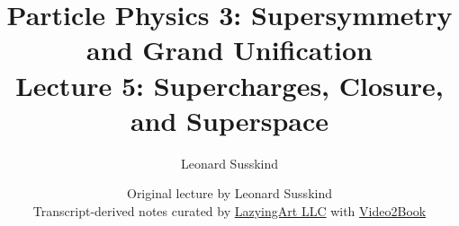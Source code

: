 \documentclass[11pt,oneside]{book}
\begin{document}
\frontmatter
\title{Particle Physics 3: Supersymmetry and Grand Unification\\[0.5em]
\large Lecture 5: Supercharges, Closure, and Superspace}
\author{Leonard Susskind}
\date{Original lecture by Leonard Susskind\\[0.4em]
Transcript-derived notes curated by
\href{https://lazying.art}{LazyingArt LLC} with
\href{https://github.com/lachlanchen/Video2Book}{Video2Book}}
\maketitle
\mainmatter

\end{document}
